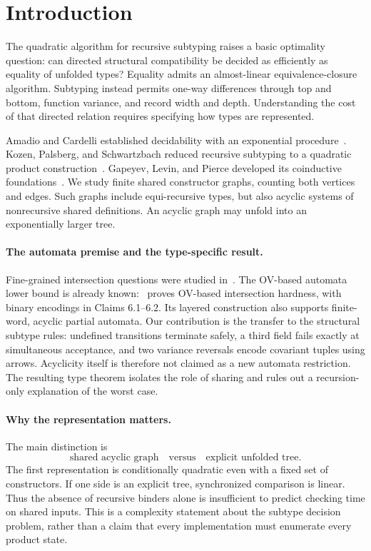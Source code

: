 \documentclass[11pt,letterpaper]{article}
\theoremstyle{definition}\newtheorem{definition}[theorem]{Definition}
\begin{document}
\section{Introduction}
The quadratic algorithm for recursive subtyping raises a basic optimality question: can directed structural compatibility be decided as efficiently as equality of unfolded types? Equality admits an almost-linear equivalence-closure algorithm. Subtyping instead permits one-way differences through top and bottom, function variance, and record width and depth. Understanding the cost of that directed relation requires specifying how types are represented.

Amadio and Cardelli established decidability with an exponential procedure~\cite{AC93}. Kozen, Palsberg, and Schwartzbach reduced recursive subtyping to a quadratic product construction~\cite{KPS93,KPS95}. Gapeyev, Levin, and Pierce developed its coinductive foundations~\cite{GLP02}. We study finite shared constructor graphs, counting both vertices and edges. Such graphs include equi-recursive types, but also acyclic systems of nonrecursive shared definitions. An acyclic graph may unfold into an exponentially larger tree.

\paragraph{The automata premise and the type-specific result.}
Fine-grained intersection questions were studied in~\cite{OW18,OW20}. The OV-based automata lower bound is already known:~\cite[Lemma 6.4]{DDFMW25} proves OV-based intersection hardness, with binary encodings in Claims 6.1--6.2. Its layered construction also supports finite-word, acyclic partial automata. Our contribution is the transfer to the structural subtype rules: undefined transitions terminate safely, a third field fails exactly at simultaneous acceptance, and two variance reversals encode covariant tuples using arrows. Acyclicity itself is therefore not claimed as a new automata restriction. The resulting type theorem isolates the role of sharing and rules out a recursion-only explanation of the worst case.

\paragraph{Why the representation matters.}
The main distinction is
\[
 \text{shared acyclic graph}\quad\text{versus}\quad\text{explicit unfolded tree}.
\]
The first representation is conditionally quadratic even with a fixed set of constructors. If one side is an explicit tree, synchronized comparison is linear. Thus the absence of recursive binders alone is insufficient to predict checking time on shared inputs. This is a complexity statement about the subtype decision problem, rather than a claim that every implementation must enumerate every product state.
\end{document}
